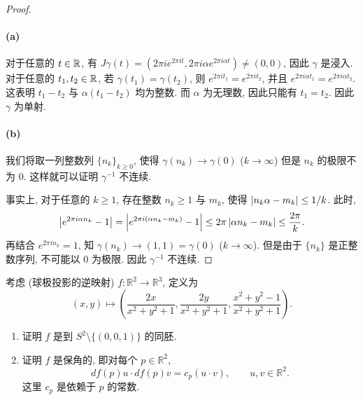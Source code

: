 \documentclass{article}
\begin{document}
\begin{proof}
	\paragraph{(a)} 对于任意的 $t \in \mathbb{R}$, 有 $J\gamma(t) = (2\pi i e^{2 \pi i t}, 2\pi i \alpha e^{2\pi i \alpha t}) \neq (0,0)	$, 因此 $\gamma$ 是浸入. 对于任意的 $t_1, t_2 \in \mathbb{R}$, 若 $\gamma(t_1) = \gamma(t_2)$, 则 $e^{2 \pi i t_1} = e^{2 \pi i t_2}$, 并且 $e^{2 \pi i \alpha t_1} = e^{2 \pi i \alpha t_2}$. 这表明 $t_1 - t_2$ 与 $\alpha (t_1 - t_2)$ 均为整数. 而 $\alpha$ 为无理数, 因此只能有 $t_1 = t_2$. 因此 $\gamma$ 为单射.

	\paragraph{(b)} 我们将取一列整数列 $\{n_k\}_{k \ge 0}$, 使得 $\gamma(n_k) \to \gamma(0)$ ($k \to \infty$) 但是 $n_k$ 的极限不为 $0$. 这样就可以证明 $\gamma^{-1}$ 不连续.

	事实上, 对于任意的 $k \ge 1$, 存在整数 $n_k \ge 1$ 与 $m_k$, 使得 $\left|n_k \alpha - m_k\right| \le 1/k$. 此时, 
	\[ \left|e^{2 \pi i \alpha n_k} - 1\right| = \left|e^{2\pi i (\alpha n_k - m_k)} - 1\right| \le 2\pi\left|\alpha n_k - m_k\right| \le \frac{2\pi}{k}.  \]
	再结合 $e^{2\pi i n_k} = 1$, 知 $\gamma(n_k) \to (1,1) = \gamma(0)$ ($k \to \infty$). 但是由于 $\{n_k\}$ 是正整数序列, 不可能以 $0$ 为极限. 因此 $\gamma^{-1}$ 不连续.
\end{proof}



\begin{problem}
  考虑 (球极投影的逆映射) $f:\mathbb{R}^2\to\mathbb{R}^3$, 定义为
  \[
    (x,y)\mapsto\left(\frac{2x}{x^2+y^2+1},\frac{2y}{x^2+y^2+1},\frac{x^2+y^2-1}{x^2+y^2+1}\right).
  \]
  \begin{enumerate}
    \item[(a)] 证明 $f$ 是到 $S^2\setminus\{(0,0,1)\}$ 的同胚.
    \item[(b)] 证明 $f$ 是保角的, 即对每个 $p\in\mathbb{R}^2$,
      \[
        df(p)u\cdot df(p)v=c_p(u\cdot v),\qquad u,v\in\mathbb{R}^2.
      \]
      这里 $c_p$ 是依赖于 $p$ 的常数.
  \end{enumerate}
\end{problem}
\end{document}
